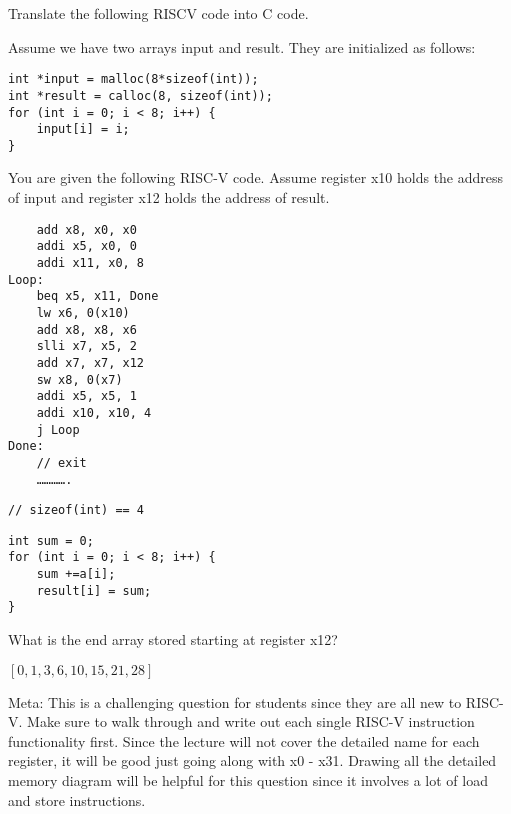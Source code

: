 \begin{blocksection}
\question
Translate the following RISCV code into C code.

Assume we have two arrays input and result. They are initialized as follows:

\begin{verbatim}
int *input = malloc(8*sizeof(int));
int *result = calloc(8, sizeof(int));
for (int i = 0; i < 8; i++) {
    input[i] = i;
}
\end{verbatim}

You are given the following RISC-V code. Assume register x10 holds the address of input and register x12 holds the address of result. 

\begin{verbatim}
    add x8, x0, x0
    addi x5, x0, 0
    addi x11, x0, 8
Loop:
    beq x5, x11, Done
    lw x6, 0(x10)
    add x8, x8, x6
    slli x7, x5, 2
    add x7, x7, x12
    sw x8, 0(x7)
    addi x5, x5, 1
    addi x10, x10, 4
    j Loop
Done:
    // exit
    ………….
\end{verbatim}

\begin{verbatim}
// sizeof(int) == 4
\end{verbatim}








\begin{solution}
\begin{verbatim}
int sum = 0;
for (int i = 0; i < 8; i++) {
    sum +=a[i];
    result[i] = sum;
}
\end{verbatim}
\end{solution}

What is the end array stored starting at register x12?

\begin{solution}
$[0, 1, 3, 6, 10, 15, 21, 28]$

Meta: This is a challenging question for students since they are all new to RISC-V. Make sure to walk through and write out each single RISC-V instruction functionality first. Since the lecture will not cover the detailed name for each register, it will be good just going along with x0 - x31. Drawing all the detailed memory diagram will be helpful for this question since it involves a lot of load and store instructions. 
\end{solution}
\end{blocksection}